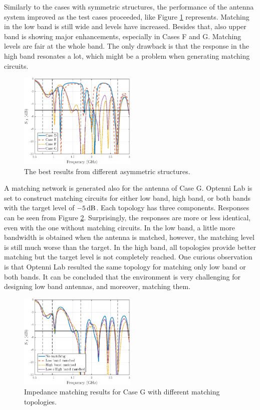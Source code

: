 Similarly to the cases with symmetric structures, the performance of the antenna system improved as the test cases proceeded, like Figure \ref{fig:concept3} represents. Matching in the low band is still wide and levels have increased. Besides that, also upper band is showing major enhancements, especially in Cases F and G. Matching levels are fair at the whole band. The only drawback is that the response in the high band resonates a lot, which might be a problem when generating matching circuits.
\begin{figure}[H]
    \centering
    \includegraphics[width=0.5\textwidth]{img/concept3.eps}
    \caption{The best results from different asymmetric structures.}
    \label{fig:concept3}
\end{figure}

A matching network is generated also for the antenna of Case G. Optenni Lab is set to construct matching circuits for either low band, high band, or both bands with the target level of $-5\,\mathrm{dB}$. Each topology has three components. Responses can be seen from Figure \ref{fig:concept3_match}. Surprisingly, the responses are more or less identical, even with the one without matching circuits. In the low band, a little more bandwidth is obtained when the antenna is matched, however, the matching level is still much worse than the target. In the high band, all topologies provide better matching but the target level is not completely reached. One curious observation is that Optenni Lab resulted the same topology for matching only low band or both bands. It can be concluded that the environment is very challenging for designing low band antennas, and moreover, matching them.
\begin{figure}[H]
    \centering
    \includegraphics[width=0.5\textwidth]{img/concept3_match.eps}
    \caption{Impedance matching results for Case G with different matching topologies.}
    \label{fig:concept3_match}
\end{figure}

